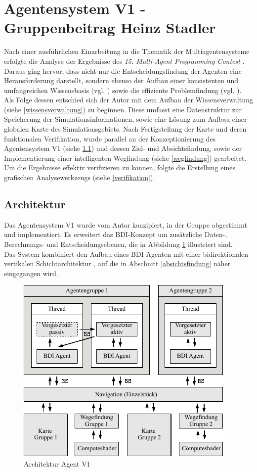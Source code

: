 \documentclass[runningheads]{llncs}
\begin{document}
\section{Agentensystem V1 - Gruppenbeitrag Heinz Stadler}
Nach einer ausführlichen Einarbeitung in die Thematik der Multiagentensysteme erfolgte die Analyse der Ergebnisse des \textit{15. Multi-Agent Programming Contest} \cite{Ahlbrecht2021}. Daraus ging hervor, dass nicht nur die Entscheidungsfindung der Agenten eine Herausforderung darstellt, sondern ebenso der Aufbau einer konsistenten und umfangreichen Wissensbasis (vgl. \cite[S. 29]{Ahlbrecht2021}) sowie die effiziente Problemfindung (vgl. \cite[S. 17]{Ahlbrecht2021}). \\
Als Folge dessen entschied sich der Autor mit dem Aufbau der Wissensverwaltung (siehe \ref{wissensverwaltung}) zu beginnen. Diese umfasst eine Datenstruktur zur Speicherung der Simulationsinformationen, sowie eine Lösung zum Aufbau einer globalen Karte des Simulationsgebiets. Nach Fertigstellung der Karte und deren funktionalen Verifikation, wurde parallel an der Konzeptionierung des Agentensystem V1 (siehe \ref{agentV1}) und dessen Ziel- und Absichtsfindung, sowie der Implementierung einer intelligenten Wegfindung (siehe \ref{wegfindung}) gearbeitet. Um die Ergebnisse effektiv verifizieren zu können, folgte die Erstellung eines grafischen Analysewerkzeugs (siehe \ref{verifikation}).
 
\subsection{Architektur}\label{agentV1}
Das Agentensystem V1 wurde vom Autor konzipiert, in der Gruppe abgestimmt und implementiert. Es erweitert das BDI-Konzept \cite{Bratman1987} um zusätzliche Daten-, Berechnungs- und Entscheidungsebenen, die in Abbildung \ref{g3:architecture} illustriert sind. \\
Das System kombiniert den Aufbau eines BDI-Agenten \cite[S. 58]{Weiss2000} mit einer bidirektionalen vertikalen Schichtarchitektur \cite[S. 61-62]{Weiss2000}, auf die in Abschnitt
\ref{absichtsfindung} näher eingegangen wird.

\begin{figure}[h]
\centering
\includegraphics[scale=1]{./Referenzen/Architekturdiagramm.pdf}
\caption{Architektur Agent V1}
\label{g3:architecture}
\end{figure}
\end{document}
